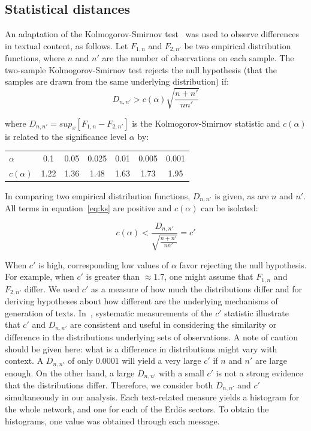 \documentclass[review]{elsarticle}
\begin{document}
\subsection{Statistical distances}
An adaptation of the Kolmogorov-Smirnov test~\cite{kolm} was used to observe differences in textual content, as follows.
Let $F_{1,n}$ and $F_{2,n'}$ be two empirical distribution functions, where $n$ and $n'$ are the number of observations on each sample.
The two-sample Kolmogorov-Smirnov test rejects the null hypothesis (that the samples are drawn from the same underlying distribution) if:
\begin{equation}\label{eq:ks}
D_{n,n'} > c(\alpha)\sqrt{\frac{n+n'}{nn'}}
\end{equation}

\noindent where $D_{n,n'}=sup_x[F_{1,n}-F_{2,n'}]$ is the Kolmogorov-Smirnov statistic
and $c(\alpha)$ is related to the significance level $\alpha$ by:

\begin{table}[H]
\centering
\begin{tabular}{l|c c c c c c}
$\alpha$ & 0.1 & 0.05 & 0.025 & 0.01 & 0.005 & 0.001 \\
$c(\alpha)$ & 1.22 & 1.36 & 1.48 & 1.63 & 1.73 & 1.95 \\
\end{tabular}
\end{table}

In comparing two empirical distribution functions,
$D_{n,n'}$ is given, as are $n$ and $n'$.
All terms in equation~\ref{eq:ks} are positive and $c(\alpha)$ can be isolated:

\begin{equation}\label{eq:ks2}
c(\alpha) < \frac{D_{n,n'}}{\sqrt{\frac{n+n'}{nn'}}} = c'
\end{equation}

When $c'$ is high, corresponding low values of $\alpha$ favor rejecting the null hypothesis.
For example, when $c'$ is greater than $\approx 1.7$, one might assume that $F_{1,n}$ and $F_{2,n'}$ differ.
We used $c'$ as a measure of how much
the distributions differ
and for deriving hypotheses
about how different are the underlying mechanisms of generation of texts.
In~\cite{kolm},
systematic measurements of the $c'$ statistic
illustrate that $c'$ and $D_{n,n'}$ are consistent and useful in considering the
similarity or difference in the distributions underlying sets of observations.
A note of caution should be given here: what is a difference in distributions
might vary with context.
A $D_{n,n'}$ of only $0.0001$ will yield a very large $c'$ if $n$ and $n'$ are large enough.
On the other hand, a large $D_{n,n'}$ with a small $c'$ is not a strong evidence that
the distributions differ.
Therefore, we consider both $D_{n,n'}$ and $c'$ simultaneously in our analysis.
Each text-related measure yields a histogram for the whole network, and one for each
of the Erdös sectors.
To obtain the histograms, one value was obtained through each message.
\end{document}
